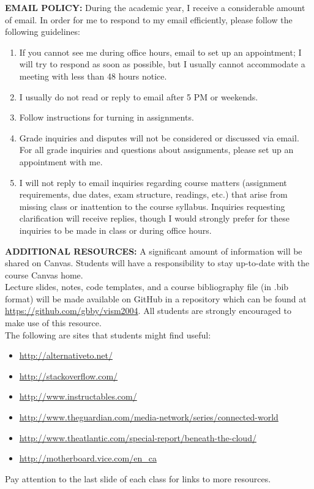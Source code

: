 \documentclass[10pt]{article}
\begin{document}
\textbf{EMAIL POLICY:} 
During the academic year, I receive a considerable amount of email. In order for me to respond to my email efficiently, please follow the following guidelines:
\begin{enumerate}
	\item If you cannot see me during office hours, email to set up an appointment; I will try to respond as soon as possible, but I usually cannot accommodate a meeting with less than 48 hours notice.
	\item I usually do not read or reply to email after 5 PM or weekends. 
	\item Follow instructions for turning in assignments. 
	\item Grade inquiries and disputes will not be considered or discussed via email. For all grade inquiries and questions about assignments, please set up an appointment with me. 
	\item I will not reply to email inquiries regarding course matters (assignment requirements, due dates, exam structure, readings, etc.) that arise from missing class or inattention to the course syllabus. Inquiries requesting clarification will receive replies, though I would strongly prefer for these inquiries to be made in class or during office hours.
\end{enumerate}

\textbf{ADDITIONAL RESOURCES:}
A significant amount of information will be shared on Canvas. Students will have a responsibility to stay up-to-date with the course Canvas home.\\ 
Lecture slides, notes, code templates, and a course bibliography file (in .bib format) will be made available on GitHub in a repository which can be found at \url{https://github.com/gbby/vism2004}. All students are strongly encouraged to make use of this resource.\\
The following are sites that students might find useful:
 \begin{itemize}[noitemsep,nolistsep]
 	\item \url{http://alternativeto.net/}
 	\item \url{http://stackoverflow.com/}
 	\item \url{http://www.instructables.com/}
 	\item \url{http://www.theguardian.com/media-network/series/connected-world}
 	\item \url{http://www.theatlantic.com/special-report/beneath-the-cloud/}
 	\item \url{http://motherboard.vice.com/en_ca}
 \end{itemize}
 Pay attention to the last slide of each class for links to more resources. 
\end{document}
